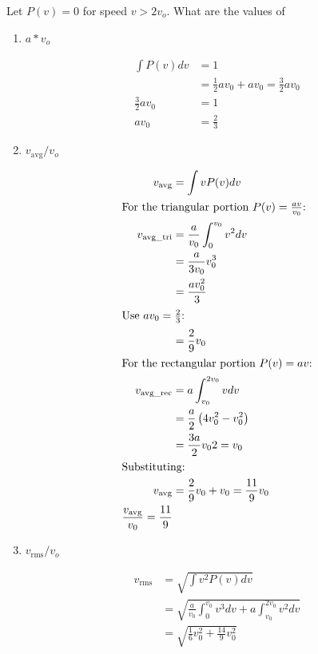 \documentclass{zc-ust-hw}
\begin{document}
\begin{enumerate}
    Let $P(v) = 0$ for speed $v > 2v_o$. What are the values of
    \begin{enumerate}
      \item $a*v_o$
        \begin{sol}
          \begin{align}
            \int P(v)dv &= 1 \\
            &= \frac{1}{2}av_{0}+av_{0} = \frac{3}{2}av_{0} \\
            \frac{3}{2}av_{0} &= 1 \\
            av_{0} &= \frac{2}{3}
          \end{align}
        \end{sol}
      \item $v_{\text{avg}}/v_o$
        \begin{sol}
          \begin{align}
            v_{\text{avg}}&=\int vP(v)dv \\
            \intertext{For the triangular portion \( P(v)=\frac{av}{v_{0}} \):}
            v_{\text{avg\_tri}}&= \frac{a}{v_{0}}\int_{0}^{v_{0}} v^2dv \\
            &= \frac{a}{3v_{0}}v_{0}^3  \\
            &= \frac{av_{0}^2}{3} \\
            \intertext{Use \( av_{0} = \frac{2}{3} \):}
            &= \frac{2}{9}v_{0} \\
            \intertext{For the rectangular portion \( P(v)=av \):}
            v_{\text{avg\_rec}} &= a\int_{v_{0}}^{2v_{0}} vdv  \\
            &= \frac{a}{2}\left( 4v_{0}^2-v_{0}^2 \right)  \\
            &= \frac{3a}{2}v_{0}2 = v_{0} \\
            \intertext{Substituting:}
            v_{\text{avg}}&=\frac{2}{9}v_{0}+v_{0} = \frac{11}{9}v_{0} \\
            \frac{v_{\text{avg}}}{v_{0}} = \frac{11}{9}
          \end{align}
        \end{sol}
      \item $v_{\text{rms}}/v_o$
        \begin{sol}
          \begin{align}
            v_\text{rms} &= \sqrt{\int v^2P(v)dv} \\
             &= \sqrt{\frac{a}{v_{0}}\int_{0}^{v_{0}}v^3 dv+a\int_{v_{0}}^{2v_{0}} v^2dv} \\
             &= \sqrt{\frac{1}{6}v_{0}^2+\frac{14}{9}v_{0}^2}  \\

\end{align}
\end{sol}
\end{enumerate}
\end{enumerate}
\end{document}
